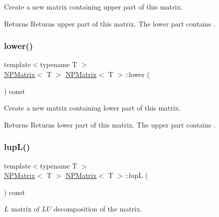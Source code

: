 Create a new matrix containing upper part of this matrix. 

\begin{DoxyReturn}{Returns}
Returns upper part of this matrix. The lower part contains {}. 
\end{DoxyReturn}
\mbox{\label{class_n_p_matrix_a4618b342917acf71c13a89afc2189eaf}} 
\subsubsection{\texorpdfstring{lower()}{lower()}}
{\footnotesize\ttfamily template$<$typename T $>$ \\
\mbox{\hyperlink{class_n_p_matrix}{N\+P\+Matrix}}$<$ T $>$ \mbox{\hyperlink{class_n_p_matrix}{N\+P\+Matrix}}$<$ T $>$\+::lower (\begin{DoxyParamCaption}{ }\end{DoxyParamCaption}) const}



Create a new matrix containing lower part of this matrix. 

\begin{DoxyReturn}{Returns}
Returns lower part of this matrix. The upper part contains {}. 
\end{DoxyReturn}
\mbox{\label{class_n_p_matrix_a21088a7eef02d4d0a0781f616037097a}} 
\subsubsection{\texorpdfstring{lupL()}{lupL()}}
{\footnotesize\ttfamily template$<$typename T $>$ \\
\mbox{\hyperlink{class_n_p_matrix}{N\+P\+Matrix}}$<$ T $>$ \mbox{\hyperlink{class_n_p_matrix}{N\+P\+Matrix}}$<$ T $>$\+::lupL (\begin{DoxyParamCaption}{ }\end{DoxyParamCaption}) const}



$ L $ matrix of $ LU $ decomposition of the matrix. 

\mbox{\label{class_n_p_matrix_a8da21c409841e612b72232d1159eec21}} 
